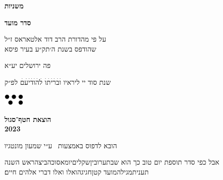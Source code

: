 \documentclass[14pt, a5paper, twoside, extrafontsizes]{memoir}
\begin{document}
\frontmatter
\pagestyle{myheadings}
\thispagestyle{mytitlepage}
\begin{hebrew}
{\Centering  

  {\huge\bfseries משניות}
  
  {\LARGE\bfseries סדר מועד}

  \vspace{1em}

  \vspace{0.5em}
  על פי מהדורת הרב דוד אלטאראס ז״ל\\שהודפס בשנת ה׳תק״ע בעיר פיסא

    \vspace{8em}
    פה {\LARGE ירושלים} יע״א

    {\small שנת}
     סוד יי ליראיו
    {\Large וׄבׄרׄיׄתׄוׄ לׄהׄוׄדׄיׄעׄםׄ}
    {\small לפ״ק}
    
    \vspace{2em}
  \includegraphics[width=10mm]{hatafSegolLogoNoText.png}\\
  
    \vspace{.5em}
  {
    \bfseries הוצאת חטף־סגול\\2023
    
 {\footnotesize  הובא לדפוס באמצעות \XeLaTeX\ ע״י שמעון מונטגיו}

  }
    
}


\vspace{1em}
{
\parskip 2pt


\vspace{4pt}
{ \small
 {\larger  אבל} כפי סדר תוספת יום טוב כך הוא\hdot
    שבת\hdot ערובין\hdot שקלים\hdot יומא\hdot סוכה\hdot ביצה\hdot ראש השנה\hdot
    תענית\hdot מגילה\hdot מועד קטן\hdot חגיגה\hdot ואלו ואלו דברי אלהים חיים׃}
}
\mainmatter
\thispagestyle{empty}














\end{hebrew}
\end{document}
